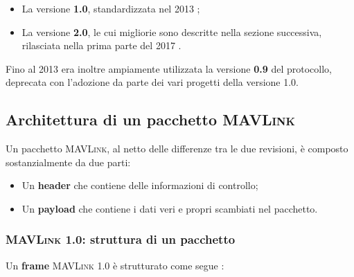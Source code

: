 \documentclass[a4paper, 12pt, oneside]{article}
\theoremstyle{definition}
\begin{document}
\begin{itemize}
    \item La versione \textbf{1.0}, standardizzata nel 2013 \cite{mavlink-versions};
    \item La versione \textbf{2.0}, le cui migliorie sono descritte nella sezione successiva, rilasciata nella prima parte del 2017 \cite{mavlink-2}.
\end{itemize}

Fino al 2013 era inoltre ampiamente utilizzata la versione \textbf{0.9} del protocollo, deprecata con l'adozione da parte dei vari progetti della versione 1.0.

\newpage
\subsection{Architettura di un pacchetto \textsc{MAVLink}}

Un pacchetto \textsc{MAVLink}, al netto delle differenze tra le due revisioni, è composto sostanzialmente da due parti:

\begin{itemize}
    \item Un \textbf{header} che contiene delle informazioni di controllo;
    \item Un \textbf{payload} che contiene i dati veri e propri scambiati nel pacchetto.
\end{itemize}

\subsubsection{\textsc{MAVLink} 1.0: struttura di un pacchetto}
Un \textbf{frame} \textsc{MAVLink} 1.0 è strutturato come segue \cite{mavlink-1-packet}:
\end{document}
